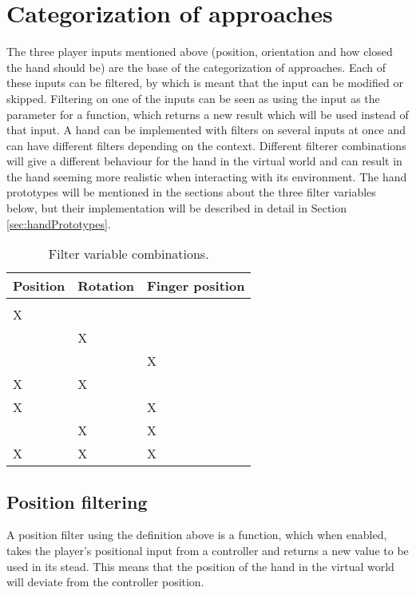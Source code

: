 \section{Categorization of approaches}
\label{sec:categorizationOfApproaches}
The three player inputs mentioned above (position, orientation and how closed the hand should be) are the base of the categorization of approaches. Each of these inputs can be filtered, by which is meant that the input can be modified or skipped. Filtering on one of the inputs can be seen as using the input as the parameter for a function, which returns a new result which will be used instead of that input. A hand can be implemented with filters on several inputs at once and can have different filters depending on the context. Different filterer combinations will give a different behaviour for the hand in the virtual world and can result in the hand seeming more realistic when interacting with its environment. The hand prototypes will be mentioned in the sections about the three filter variables below, but their implementation will be described in detail in Section \ref{sec:handPrototypes}.

\begin{table}[H]
\centering
\caption{Filter variable combinations.}
\label{tab:filterVariableCombinations}
\begin{tabular}{C{2cm}C{2cm}C{2cm}}
Position & Rotation & Finger position \\ \midrule \midrule
				&					&					\\ \midrule
\Large X	&					&					\\ \midrule
				& \Large X	& 		                \\ \midrule
				&					& \Large X     \\ \midrule
\Large X	& \Large X	&					\\ \midrule
\Large X 	&					& \Large X	\\ \midrule
				& \Large X	& \Large X	\\ \midrule
\Large X 	& \Large X 	& \Large X
\end{tabular}
\end{table}

\subsection{Position filtering}
\label{subsec:categoryPositionFiltering}
A position filter using the definition above is a function, which when enabled, takes the player's positional input from a controller and returns a new value to be used in its stead. This means that the position of the hand in the virtual world will deviate from the controller position.\\

